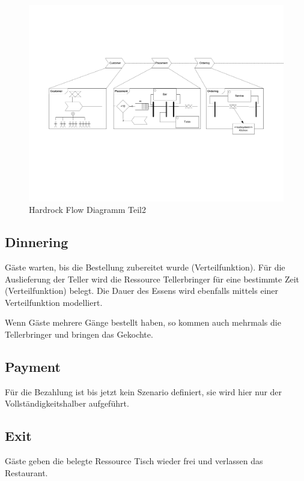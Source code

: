 \documentclass[ngerman,a4paper,12pt]{scrreprt}
\begin{document}
\begin{landscape}
		\begin{figure}[H]
				\includegraphics[page=2,trim=0cm 7cm 2cm 5cm, clip=true,width=1.4\textwidth]{../model/Modell_v2.pdf}
				\caption[Hardrock Flow Diagramm Teil2]{Hardrock Flow Diagramm Teil2}
				\label{flowDiagramm2}
		\end{figure}
		
		\subsection{Dinnering}
		Gäste warten, bis die Bestellung zubereitet wurde (Verteilfunktion). Für die Auslieferung der Teller wird die Ressource Tellerbringer für eine bestimmte Zeit (Verteilfunktion) belegt. Die Dauer des Essens wird ebenfalls mittels einer Verteilfunktion modelliert.
		
		Wenn Gäste mehrere Gänge bestellt haben, so kommen auch mehrmals die Tellerbringer und bringen das Gekochte.
		
		\subsection{Payment}
		Für die Bezahlung ist bis jetzt kein Szenario definiert, sie wird hier nur der Vollständigkeitshalber aufgeführt.
		
		\subsection{Exit}
		Gäste geben die belegte Ressource Tisch wieder frei und verlassen das Restaurant.
		

\end{landscape}
\end{document}
